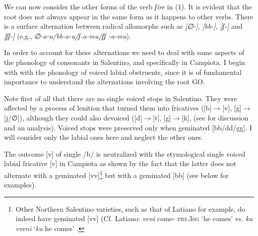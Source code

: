 \documentclass[output=paper]{langscibook}
\begin{document}
We can now consider the other forms of the verb \textit{ʃire}  in  (1).  It is evident that the root does not always appear in the same form as it happens to other verbs.  There is a surface alternation between radical allomorphs such as  \textit{[∅-], [bb-], [ʃ-]}  and  \textit{[ʃʃ-]}  (e.g.,  \textit{∅-a-u/bb-a-u/ʃ-a-mu/ʃʃ -a-mu}).

In order to account for these alternations we need to deal with some aspects of the phonology of consonants in Salentino, and specifically in Campiota.   I begin with with the phonology of voiced labial obstruents, since it is of fundamental importance to understand the alternations involving the root GO.

Note first of all that there are no single voiced stops in Salentino.  They were affected by a process of lenition that turned them into fricatives ([b]$\rightarrow$[v], [g]$\rightarrow$ [j/∅]), although they could also devoiced ([d]$\rightarrow$[t], [g]$\rightarrow$[k], (see \citealt{calabrese1987a} for discussion and an analysis).  Voiced stops were preserved only when geminated [bb/dd/gg]. I will consider only the labial ones here and neglect the other ones.

The outcome [v] of single /b/ is neutralized with the etymological single voiced labial fricative [v] in Campiota as shown by the fact that  the latter does not alternate with a geminated [vv]\footnote{Other Northern Salentino varieties, such as that of Latiano for example, do indeed have geminated [vv] (Cf. Latiano: \textit{veni} come- \textsc{prs}.\textsc{3sg} ‘he comes’ vs. \textit{ku vveni} ‘\textit{ku} he comes’ \citep{urgese2003a}.}  but with a geminated [bb] (see below for examples).
\end{document}
